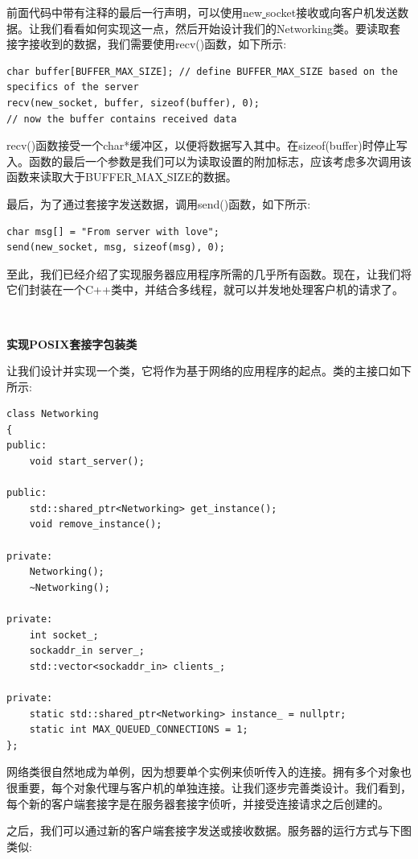 前面代码中带有注释的最后一行声明，可以使用new\underline{ }socket接收或向客户机发送数据。让我们看看如何实现这一点，然后开始设计我们的Networking类。要读取套接字接收到的数据，我们需要使用recv()函数，如下所示: \par

\begin{lstlisting}[caption={}]
char buffer[BUFFER_MAX_SIZE]; // define BUFFER_MAX_SIZE based on the
specifics of the server
recv(new_socket, buffer, sizeof(buffer), 0);
// now the buffer contains received data
\end{lstlisting}

recv()函数接受一个char*缓冲区，以便将数据写入其中。在sizeof(buffer)时停止写入。函数的最后一个参数是我们可以为读取设置的附加标志，应该考虑多次调用该函数来读取大于BUFFER\underline{ }MAX\underline{ }SIZE的数据。 \par
最后，为了通过套接字发送数据，调用send()函数，如下所示: \par

\begin{lstlisting}[caption={}]
char msg[] = "From server with love";
send(new_socket, msg, sizeof(msg), 0);
\end{lstlisting}

至此，我们已经介绍了实现服务器应用程序所需的几乎所有函数。现在，让我们将它们封装在一个C++类中，并结合多线程，就可以并发地处理客户机的请求了。 \par

\noindent\textbf{}\ \par
\textbf{实现POSIX套接字包装类} \ \par
让我们设计并实现一个类，它将作为基于网络的应用程序的起点。类的主接口如下所示: \par

\begin{lstlisting}[caption={}]
class Networking
{
public:
	void start_server();
	
public:
	std::shared_ptr<Networking> get_instance();
	void remove_instance();
	
private:
	Networking();
	~Networking();
	
private:
	int socket_;
	sockaddr_in server_;
	std::vector<sockaddr_in> clients_;
	
private:
	static std::shared_ptr<Networking> instance_ = nullptr;
	static int MAX_QUEUED_CONNECTIONS = 1;
};
\end{lstlisting}

网络类很自然地成为单例，因为想要单个实例来侦听传入的连接。拥有多个对象也很重要，每个对象代理与客户机的单独连接。让我们逐步完善类设计。我们看到，每个新的客户端套接字是在服务器套接字侦听，并接受连接请求之后创建的。 \par
之后，我们可以通过新的客户端套接字发送或接收数据。服务器的运行方式与下图类似: \par


